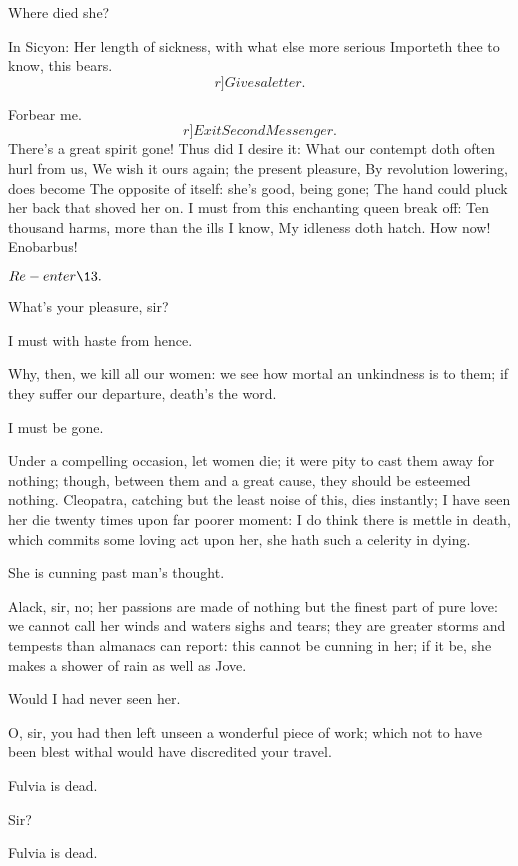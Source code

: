 \documentclass{book}
\begin{document}
\1	Where died she?

	In Sicyon: 
	Her length of sickness, with what else more serious
	Importeth thee to know, this bears. \\   \[r]Gives a letter.\]

\1	Forbear me.
	\[r]Exit Second Messenger.\]
	There's a great spirit gone! Thus did I desire it:
	What our contempt doth often hurl from us, 
        We wish it ours again; the present pleasure, 
	By revolution lowering, does become
	The opposite of itself: she's good, being gone;
	The hand could pluck her back that shoved her on.
	I must from this enchanting queen break off:
	Ten thousand harms, more than the ills I know,
	My idleness doth hatch. How now! Enobarbus!

	\(Re-enter \13.\)

\begin{PROSE}

	What's your pleasure, sir?

\1	I must with haste from hence.

	Why, then, we kill all our women:
	we see how mortal an unkindness is to them;
	if they suffer our departure, death's the word.

\1	I must be gone.

	Under a compelling occasion, let women die; it were
	pity to cast them away for nothing; though, between
	them and a great cause, they should be esteemed
	nothing. Cleopatra, catching but the least noise of
	this, dies instantly; I have seen her die twenty
	times upon far poorer moment: I do think there is
	mettle in death, which commits some loving act upon
	her, she hath such a celerity in dying.

\1	She is cunning past man's thought.

	Alack, sir, no; her passions are made of nothing but
	the finest part of pure love: we cannot call her
	winds and waters sighs and tears; they are greater
	storms and tempests than almanacs can report: this
	cannot be cunning in her; if it be, she makes a
	shower of rain as well as Jove.

\1	Would I had never seen her.

	O, sir, you had then left unseen a wonderful piece
	of work; which not to have been blest withal would
	have discredited your travel.

\1	Fulvia is dead.

	Sir?

\1	Fulvia is dead.


\end{PROSE}
\end{document}
